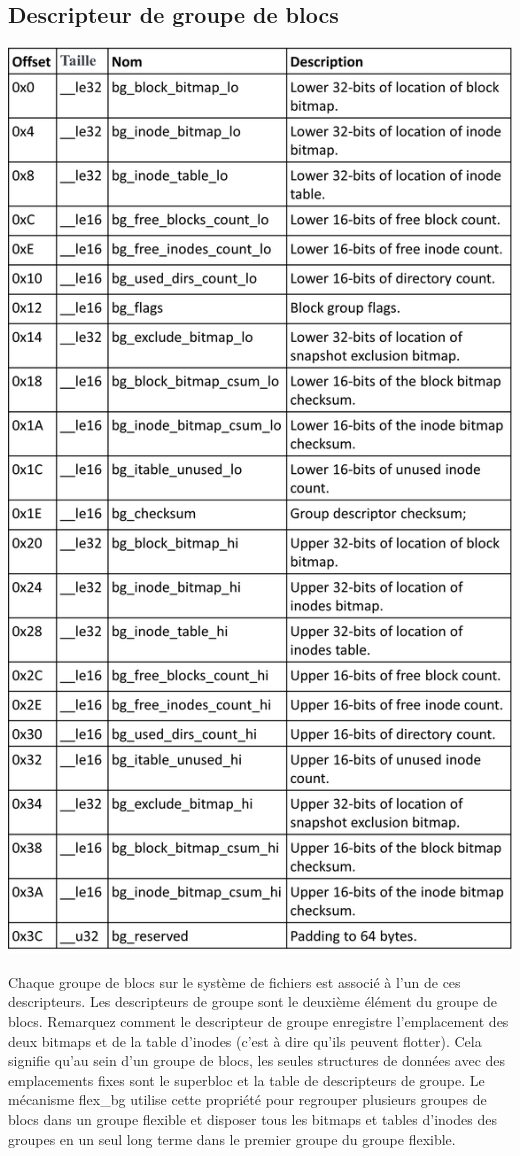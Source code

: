 \documentclass[12pt, letterpaper]{report}
\begin{document}
\subsection{Descripteur de groupe de blocs}

\begin{center}
	\includegraphics[width=\textwidth]{blockdesc}
\end{center}
Chaque groupe de blocs sur le système de fichiers est associé à l'un de ces descripteurs. Les descripteurs de groupe sont le deuxième élément du groupe de blocs. \newline
Remarquez comment le descripteur de groupe enregistre l'emplacement des deux bitmaps et de la table d'inodes (c'est à dire qu'ils peuvent flotter). Cela signifie qu'au sein d'un groupe de blocs, les seules structures de données avec des emplacements fixes sont le superbloc et la table de descripteurs de groupe. Le mécanisme flex\_bg utilise cette propriété pour regrouper plusieurs groupes de blocs dans un groupe flexible et disposer tous les bitmaps et tables d'inodes des groupes en un seul long terme dans le premier groupe du groupe flexible.
\end{document}
